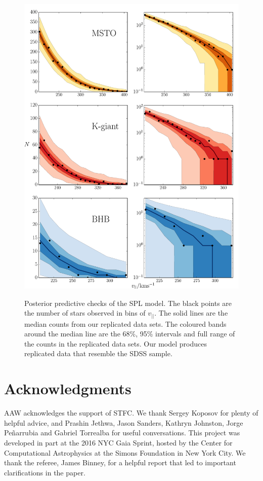 \documentclass[useAMS,twocolumn,usenatbib]{mn2e}
\def\vlos{{v_{||}}}
\begin{document}
\begin{figure}
\includegraphics[width=1.5\columnwidth]{plots/ppc}\\
\caption{Posterior predictive checks of the SPL model. 
The black points are the number of stars observed in bins of $\vlos$. 
The solid lines are the median counts from our replicated data sets. 
The coloured bands around the median line are the 68\%, 95\% intervals and full range of the counts in the replicated data sets. 
Our model produces replicated data that resemble the SDSS sample.}
\label{fig:ppc}
\end{figure}

\section*{Acknowledgments}
AAW acknowledges the support of STFC. 
We thank Sergey Koposov for plenty of helpful advice, and Prashin Jethwa, Jason Sanders, Kathryn Johnston, Jorge Pe\~{n}arrubia and Gabriel Torrealba for useful conversations. 
This project was developed in part at the 2016 NYC Gaia Sprint, hosted by the Center for Computational Astrophysics at the Simons Foundation in New York City.
We thank the referee, James Binney, for a helpful report that led to important clarifications in the paper. 
\end{document}
